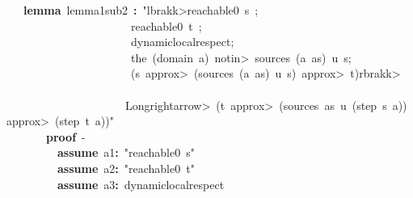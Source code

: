 \documentclass{article}
\newcommand{\syntaxKEYWORDA}[1]{\textcolor[rgb]{0.0,0.4,0.6}{\textbf{#1}}}
\newcommand{\syntaxKEYWORDC}[1]{\textcolor[rgb]{0.0,0.6,1.0}{\textbf{#1}}}
\newcommand{\syntaxLITERALA}[1]{\textcolor[rgb]{1.0,0.0,0.8}{#1}}
\newcommand{\syntaxOPERATOR}[1]{\textcolor[rgb]{0.0,0.0,0.0}{\textbf{#1}}}
\newcommand{\syntaxKEYWORDA}[1]{\textcolor[rgb]{0.0,0.4,0.6}{\textbf{#1}}}
\newcommand{\syntaxKEYWORDC}[1]{\textcolor[rgb]{0.0,0.6,1.0}{\textbf{#1}}}
\newcommand{\syntaxLITERALA}[1]{\textcolor[rgb]{1.0,0.0,0.8}{#1}}
\newcommand{\syntaxOPERATOR}[1]{\textcolor[rgb]{0.0,0.0,0.0}{\textbf{#1}}}
\newcommand{\syntaxKEYWORDA}[1]{\textcolor[rgb]{0.0,0.4,0.6}{\textbf{#1}}}
\newcommand{\syntaxKEYWORDC}[1]{\textcolor[rgb]{0.0,0.6,1.0}{\textbf{#1}}}
\newcommand{\syntaxLITERALA}[1]{\textcolor[rgb]{1.0,0.0,0.8}{#1}}
\newcommand{\syntaxOPERATOR}[1]{\textcolor[rgb]{0.0,0.0,0.0}{\textbf{#1}}}
\newcommand{\syntaxKEYWORDA}[1]{\textcolor[rgb]{0.0,0.4,0.6}{#1}}
\newcommand{\syntaxKEYWORDC}[1]{\textcolor[rgb]{0.0,0.6,1.0}{#1}}
\newcommand{\syntaxLITERALA}[1]{\textcolor[rgb]{1.0,0.0,0.8}{\textbf{#1}}}
\newcommand{\syntaxOPERATOR}[1]{\textcolor[rgb]{0.0,0.0,0.0}{#1}}
\newcommand{\syntaxKEYWORDA}[1]{\textcolor[rgb]{0.0,0.4,0.6}{\textbf{#1}}}
\newcommand{\syntaxKEYWORDC}[1]{\textcolor[rgb]{0.0,0.6,1.0}{\textbf{#1}}}
\newcommand{\syntaxLITERALA}[1]{\textcolor[rgb]{1.0,0.0,0.8}{#1}}
\newcommand{\syntaxOPERATOR}[1]{\textcolor[rgb]{0.0,0.0,0.0}{\textbf{#1}}}
\newcommand{\syntaxKEYWORDA}[1]{\textcolor[rgb]{0.0,0.4,0.6}{\textbf{#1}}}
\newcommand{\syntaxKEYWORDC}[1]{\textcolor[rgb]{0.0,0.6,1.0}{\textbf{#1}}}
\newcommand{\syntaxLITERALA}[1]{\textcolor[rgb]{1.0,0.0,0.8}{#1}}
\newcommand{\syntaxOPERATOR}[1]{\textcolor[rgb]{0.0,0.0,0.0}{\textbf{#1}}}
\begin{document}
{\ }{\ }{\ }{\ }\syntaxKEYWORDA{lemma}{\ }lemma\usebox{\underscorebox}1\usebox{\underscorebox}sub\usebox{\underscorebox}2{\ }\syntaxOPERATOR{:}{\ }\syntaxLITERALA{"\<lbrakk>reachable0{\ }s{\ };}\hspace*{\fill}\\
\syntaxLITERALA{{\ }{\ }{\ }{\ }{\ }{\ }{\ }{\ }{\ }{\ }{\ }{\ }{\ }{\ }{\ }{\ }{\ }{\ }{\ }{\ }{\ }{\ }{\ }reachable0{\ }t{\ };}\hspace*{\fill}\\
\syntaxLITERALA{{\ }{\ }{\ }{\ }{\ }{\ }{\ }{\ }{\ }{\ }{\ }{\ }{\ }{\ }{\ }{\ }{\ }{\ }{\ }{\ }{\ }{\ }{\ }dynamic\usebox{\underscorebox}local\usebox{\underscorebox}respect;}\hspace*{\fill}\\
\syntaxLITERALA{{\ }{\ }{\ }{\ }{\ }{\ }{\ }{\ }{\ }{\ }{\ }{\ }{\ }{\ }{\ }{\ }{\ }{\ }{\ }{\ }{\ }{\ }{\ }the{\ }(domain{\ }a){\ }\<notin>{\ }sources{\ }(a{\ }\usebox{\hashbox}{\ }as){\ }u{\ }s;{\ }}\hspace*{\fill}\\
\syntaxLITERALA{{\ }{\ }{\ }{\ }{\ }{\ }{\ }{\ }{\ }{\ }{\ }{\ }{\ }{\ }{\ }{\ }{\ }{\ }{\ }{\ }{\ }{\ }{\ }(s{\ }\<approx>{\ }(sources{\ }(a{\ }\usebox{\hashbox}{\ }as){\ }u{\ }s){\ }\<approx>{\ }t)\<rbrakk>{\ }{\ }{\ }{\ }{\ }{\ }{\ }}\hspace*{\fill}\\
\syntaxLITERALA{{\ }{\ }{\ }{\ }{\ }{\ }{\ }{\ }{\ }{\ }{\ }{\ }{\ }{\ }{\ }{\ }{\ }{\ }{\ }{\ }{\ }{\ }\<Longrightarrow>{\ }(t{\ }\<approx>{\ }(sources{\ }as{\ }u{\ }(step{\ }s{\ }a)){\ }\<approx>{\ }(step{\ }t{\ }a))"}\hspace*{\fill}\\
{\ }{\ }{\ }{\ }{\ }{\ }{\ }{\ }\syntaxKEYWORDA{proof}{\ }{-}{\ }\hspace*{\fill}\\
{\ }{\ }{\ }{\ }{\ }{\ }{\ }{\ }{\ }{\ }\syntaxKEYWORDC{assume}{\ }a1\syntaxOPERATOR{:}{\ }\syntaxLITERALA{"reachable0{\ }s"}\hspace*{\fill}\\
{\ }{\ }{\ }{\ }{\ }{\ }{\ }{\ }{\ }{\ }\syntaxKEYWORDC{assume}{\ }a2\syntaxOPERATOR{:}{\ }\syntaxLITERALA{"reachable0{\ }t"}\hspace*{\fill}\\
{\ }{\ }{\ }{\ }{\ }{\ }{\ }{\ }{\ }{\ }\syntaxKEYWORDC{assume}{\ }a3\syntaxOPERATOR{:}{\ }dynamic\usebox{\underscorebox}local\usebox{\underscorebox}respect\hspace*{\fill}\\
\end{document}
